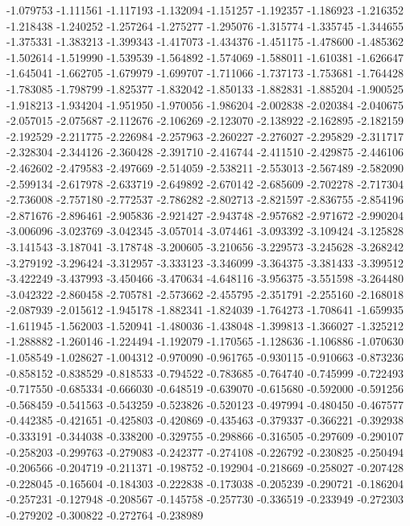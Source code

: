 -1.079753
-1.111561
-1.117193
-1.132094
-1.151257
-1.192357
-1.186923
-1.216352
-1.218438
-1.240252
-1.257264
-1.275277
-1.295076
-1.315774
-1.335745
-1.344655
-1.375331
-1.383213
-1.399343
-1.417073
-1.434376
-1.451175
-1.478600
-1.485362
-1.502614
-1.519990
-1.539539
-1.564892
-1.574069
-1.588011
-1.610381
-1.626647
-1.645041
-1.662705
-1.679979
-1.699707
-1.711066
-1.737173
-1.753681
-1.764428
-1.783085
-1.798799
-1.825377
-1.832042
-1.850133
-1.882831
-1.885204
-1.900525
-1.918213
-1.934204
-1.951950
-1.970056
-1.986204
-2.002838
-2.020384
-2.040675
-2.057015
-2.075687
-2.112676
-2.106269
-2.123070
-2.138922
-2.162895
-2.182159
-2.192529
-2.211775
-2.226984
-2.257963
-2.260227
-2.276027
-2.295829
-2.311717
-2.328304
-2.344126
-2.360428
-2.391710
-2.416744
-2.411510
-2.429875
-2.446106
-2.462602
-2.479583
-2.497669
-2.514059
-2.538211
-2.553013
-2.567489
-2.582090
-2.599134
-2.617978
-2.633719
-2.649892
-2.670142
-2.685609
-2.702278
-2.717304
-2.736008
-2.757180
-2.772537
-2.786282
-2.802713
-2.821597
-2.836755
-2.854196
-2.871676
-2.896461
-2.905836
-2.921427
-2.943748
-2.957682
-2.971672
-2.990204
-3.006096
-3.023769
-3.042345
-3.057014
-3.074461
-3.093392
-3.109424
-3.125828
-3.141543
-3.187041
-3.178748
-3.200605
-3.210656
-3.229573
-3.245628
-3.268242
-3.279192
-3.296424
-3.312957
-3.333123
-3.346099
-3.364375
-3.381433
-3.399512
-3.422249
-3.437993
-3.450466
-3.470634
-4.648116
-3.956375
-3.551598
-3.264480
-3.042322
-2.860458
-2.705781
-2.573662
-2.455795
-2.351791
-2.255160
-2.168018
-2.087939
-2.015612
-1.945178
-1.882341
-1.824039
-1.764273
-1.708641
-1.659935
-1.611945
-1.562003
-1.520941
-1.480036
-1.438048
-1.399813
-1.366027
-1.325212
-1.288882
-1.260146
-1.224494
-1.192079
-1.170565
-1.128636
-1.106886
-1.070630
-1.058549
-1.028627
-1.004312
-0.970090
-0.961765
-0.930115
-0.910663
-0.873236
-0.858152
-0.838529
-0.818533
-0.794522
-0.783685
-0.764740
-0.745999
-0.722493
-0.717550
-0.685334
-0.666030
-0.648519
-0.639070
-0.615680
-0.592000
-0.591256
-0.568459
-0.541563
-0.543259
-0.523826
-0.520123
-0.497994
-0.480450
-0.467577
-0.442385
-0.421651
-0.425803
-0.420869
-0.435463
-0.379337
-0.366221
-0.392938
-0.333191
-0.344038
-0.338200
-0.329755
-0.298866
-0.316505
-0.297609
-0.290107
-0.258203
-0.299763
-0.279083
-0.242377
-0.274108
-0.226792
-0.230825
-0.250494
-0.206566
-0.204719
-0.211371
-0.198752
-0.192904
-0.218669
-0.258027
-0.207428
-0.228045
-0.165604
-0.184303
-0.222838
-0.173038
-0.205239
-0.290721
-0.186204
-0.257231
-0.127948
-0.208567
-0.145758
-0.257730
-0.336519
-0.233949
-0.272303
-0.279202
-0.300822
-0.272764
-0.238989
